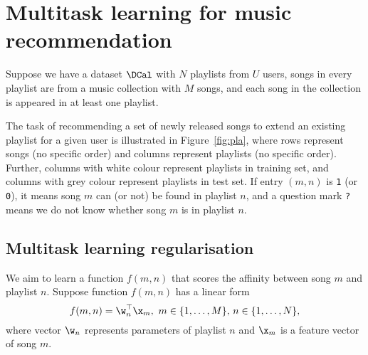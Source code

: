\section{Multitask learning for music recommendation}
\label{sec:method}


Suppose we have a dataset $\DCal$ with $N$ playlists from $U$ users, songs in every playlist are from a music collection
with $M$ songs, and each song in the collection is appeared in at least one playlist.

The task of recommending a set of newly released songs to extend an existing playlist for a given user is illustrated in Figure~\ref{fig:pla},
where rows represent songs (no specific order) and columns represent playlists (no specific order).
Further, columns with white colour represent playlists in training set,
and columns with grey colour represent playlists in test set.
If entry $(m, n)$ is \texttt{1} (or \texttt{0}),
it means song $m$ can (or not) be found in playlist $n$,
and a question mark \texttt{?} means we do not know whether song $m$ is in playlist $n$.






\subsection{Multitask learning regularisation}

%
We aim to learn a function $f(m, n)$ that scores the affinity between song $m$ and playlist $n$.
Suppose function $f(m, n)$ has a linear form
\begin{equation}
\label{eq:scorefunc}
f(m, n) = \w_n^\top \x_m, \  m \in \{1,\dots,M\}, \, n \in \{1,\dots,N\},
\end{equation}
where vector $\w_n$ represents parameters of playlist $n$ and $\x_m$ is a feature vector of song $m$.


